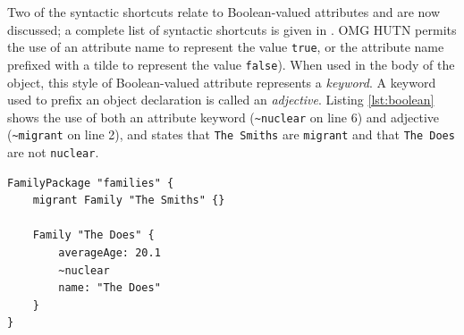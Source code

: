 Two of the syntactic shortcuts relate to Boolean-valued attributes and are now discussed; a complete list of syntactic shortcuts is given in \cite{hutn}. OMG HUTN permits the use of an attribute name to represent the value \texttt{true}, or the attribute name prefixed with a tilde to represent the value \texttt{false}). When used in the body of the object, this style of Boolean-valued attribute represents a \emph{keyword}. A keyword used to prefix an object declaration is called an \emph{adjective}. Listing \ref{lst:boolean} shows the use of both an attribute keyword (\texttt{\textasciitilde nuclear} on line 6) and adjective (\texttt{\textasciitilde migrant} on line 2), and states that \texttt{The Sm\-it\-hs} are \texttt{mi\-gr\-a\-nt} and that \texttt{The Do\-es} are not \texttt{nu\-cl\-e\-ar}.

\begin{lstlisting}[caption={[Keywords and adjectives in HUTN]Keywords and adjectives in HUTN, taken from \cite{rose08hutn}}, label=lst:boolean, language=HutnFamilies]
FamilyPackage "families" {
    migrant Family "The Smiths" {}

    Family "The Does" {
        averageAge: 20.1
        ~nuclear
        name: "The Does"
    }
}
\end{lstlisting}


